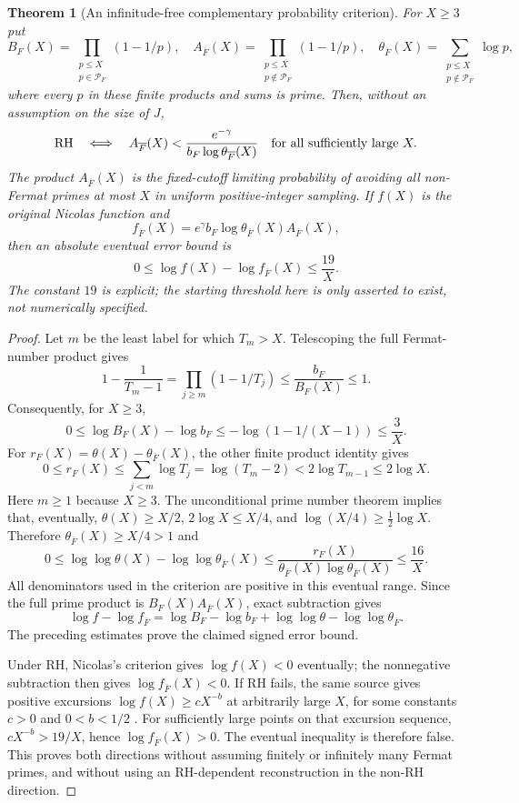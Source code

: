 \documentclass[11pt]{article}
\newtheorem{theorem}{Theorem}[section]
\theoremstyle{definition}
\begin{document}
\begin{theorem}[An infinitude-free complementary probability criterion]
\label{thm:fermat-complement-nicolas}
For $X\ge3$ put
\[
 B_F(X)=\prod_{\substack{p\le X\\p\in\mathcal P_F}}(1-1/p),
 \quad
 A_{\overline F}(X)=
      \prod_{\substack{p\le X\\p\notin\mathcal P_F}}(1-1/p),
 \quad
 \theta_{\overline F}(X)=
      \sum_{\substack{p\le X\\p\notin\mathcal P_F}}\log p,
\]
where every $p$ in these finite products and sums is prime.
Then, without an assumption on the size of $J$,
\[
 \mathrm{RH}\quad\Longleftrightarrow\quad
 A_{\overline F}(X)<
 \frac{e^{-\gamma}}{b_F\log\theta_{\overline F}(X)}
 \quad\hbox{for all sufficiently large }X.
\]
The product $A_{\overline F}(X)$ is the fixed-cutoff limiting
probability of avoiding all non-Fermat primes at most $X$ in
uniform positive-integer sampling. If $f(X)$ is the original
Nicolas function and
\[
 f_{\overline F}(X)=e^\gamma b_F
             \log\theta_{\overline F}(X)A_{\overline F}(X),
\]
then an absolute eventual error bound is
\[
 0\le\log f(X)-\log f_{\overline F}(X)\le\frac{19}{X}.
\]
The constant $19$ is explicit; the starting threshold here is
only asserted to exist, not numerically specified.
\end{theorem}

\begin{proof}
Let $m$ be the least label for which $T_m>X$. Telescoping the
full Fermat-number product gives
\[
 1-\frac1{T_m-1}
 =\prod_{j\ge m}(1-1/T_j)
 \le\frac{b_F}{B_F(X)}\le1.
\]
Consequently, for $X\ge3$,
\[
 0\le\log B_F(X)-\log b_F
 \le-\log(1-1/(X-1))\le\frac3X.
\]
For $r_F(X)=\theta(X)-\theta_{\overline F}(X)$, the other
finite product identity gives
\[
 0\le r_F(X)\le\sum_{j<m}\log T_j
 =\log(T_m-2)<2\log T_{m-1}\le2\log X.
\]
Here $m\ge1$ because $X\ge3$.
The unconditional prime number theorem implies that, eventually,
$\theta(X)\ge X/2$, $2\log X\le X/4$, and
$\log(X/4)\ge\tfrac12\log X$. Therefore
$\theta_{\overline F}(X)\ge X/4>1$ and
\[
 0\le\log\log\theta(X)-\log\log\theta_{\overline F}(X)
 \le\frac{r_F(X)}{
      \theta_{\overline F}(X)\log\theta_{\overline F}(X)}
 \le\frac{16}{X}.
\]
All denominators used in the criterion are positive in this
eventual range. Since the full prime product is
$B_F(X)A_{\overline F}(X)$, exact subtraction gives
\[
 \log f-\log f_{\overline F}
 =\log B_F-\log b_F+
   \log\log\theta-\log\log\theta_{\overline F}.
\]
The preceding estimates prove the claimed signed error bound.

Under RH, Nicolas's criterion gives $\log f(X)<0$ eventually;
the nonnegative subtraction then gives
$\log f_{\overline F}(X)<0$. If RH fails, the same source
gives positive excursions
$\log f(X)\ge cX^{-b}$ at arbitrarily large $X$, for some
constants $c>0$ and $0<b<1/2$
\cite[equation~(1.10)]{Nicolas2012}.
For sufficiently large points on that excursion sequence,
$cX^{-b}>19/X$, hence $\log f_{\overline F}(X)>0$.
The eventual inequality is therefore false. This proves both
directions without assuming finitely or infinitely many Fermat
primes, and without using an RH-dependent reconstruction in
the non-RH direction.
\end{proof}
\end{document}
